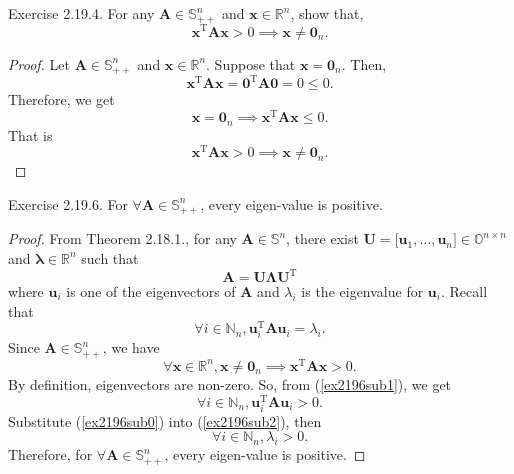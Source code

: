 \documentclass{article}
\theoremstyle{plain}
\begin{document}
\begin{itembox}[l]{Exercise 2.19.4.}
	For any $\bm{A} \in \mathbb{S}_{++}^n$ and $\bm{x} \in \mathbb{R}^n$,
	show that,
	\begin{equation}
		\label{ex2194}
		\bm{x}^{\mathrm{T}} \bm{A} \bm{x} > 0 \implies \bm{x} \neq \bm{0}_n .
	\end{equation}
\end{itembox}


\begin{proof}
	Let $\bm{A} \in \mathbb{S}_{++}^n$ and $\bm{x} \in \mathbb{R}^n$.
	Suppose that $\bm{x} = \bm{0}_n$. Then,
	\begin{equation*}
		\bm{x}^{\mathrm{T}} \bm{A} \bm{x} = \bm{0}^{\mathrm{T}} \bm{A} \bm{0}
		= 0 \leq 0 .
	\end{equation*}
	Therefore, we get
	\begin{equation*}
		\bm{x} = \bm{0}_n \implies \bm{x}^{\mathrm{T}} \bm{A} \bm{x} \leq 0 .
	\end{equation*}
	That is
	\begin{equation*}
		\bm{x}^{\mathrm{T}} \bm{A} \bm{x} > 0 \implies \bm{x} \neq \bm{0}_n .
	\end{equation*}
\end{proof}


\begin{itembox}[l]{Exercise 2.19.6.}
	For $\forall \bm{A} \in \mathbb{S}_{++}^n$, every eigen-value is positive.
\end{itembox}


\begin{proof}
	From Theorem 2.18.1., for any $\bm{A} \in \mathbb{S}^n$,
	there exist $\bm{U} = \lbrack \bm{u}_1 , \ldots , \bm{u}_n \rbrack \in \mathbb{O}^{n \times n}$
	and $\bm{\lambda} \in \mathbb{R}^n$
	such that
	\begin{equation*}
		\bm{A} = \bm{U} \bm{\Lambda} \bm{U}^{\mathrm{T}}
	\end{equation*}
	where $\bm{u}_i$ is one of the eigenvectors of $\bm{A}$ and $\lambda_i$ is the eigenvalue for $\bm{u}_i$.
	Recall that
	\begin{equation}
		\label{ex2196sub0}
		\forall i \in \mathbb{N}_n, \bm{u}_i^{\mathrm{T}} \bm{A} \bm{u}_i = \lambda_i.
	\end{equation}
	Since $\bm{A} \in \mathbb{S}_{++}^n$, we have
	\begin{equation}
		\label{ex2196sub1}
		\forall \bm{x} \in \mathbb{R}^n, \bm{x} \neq \bm{0}_n \implies \bm{x}^{\mathrm{T}} \bm{A} \bm{x} > 0 .
	\end{equation}
	By definition, eigenvectors are non-zero. So, from (\ref{ex2196sub1}), we get
	\begin{equation}
		\label{ex2196sub2}
		\forall i \in \mathbb{N}_n, \bm{u}_i^{\mathrm{T}} \bm{A} \bm{u}_i > 0 .
	\end{equation}
	Substitute (\ref{ex2196sub0}) into (\ref{ex2196sub2}), then
	\begin{equation*}
		\forall i \in \mathbb{N}_n, \lambda_i > 0 .
	\end{equation*}
	Therefore, for $\forall \bm{A} \in \mathbb{S}_{++}^n$, every eigen-value is positive.
\end{proof}
\end{document}
